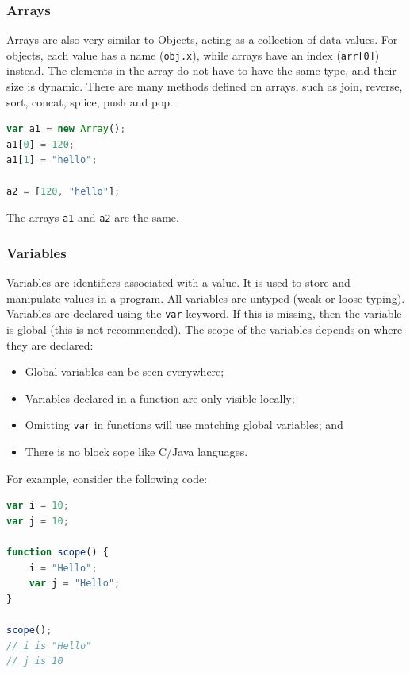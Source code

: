 \documentclass[a4paper, openany]{memoir}
\begin{document}
\subsubsection{Arrays}
Arrays are also very similar to Objects, acting as a collection of data values. For objects, each value has a name (\texttt{obj.x}), while arrays have an index (\texttt{arr[0]}) instead. The elements in the array do not have to have the same type, and their size is dynamic. There are many methods defined on arrays, such as join, reverse, sort, concat, splice, push and pop.
\begin{lstlisting}[language=javascript]
var a1 = new Array();
a1[0] = 120;
a1[1] = "hello";

a2 = [120, "hello"];
\end{lstlisting}
The arrays \texttt{a1} and \texttt{a2} are the same.

\subsubsection{Variables}
Variables are identifiers associated with a value. It is used to store and manipulate values in a program. All variables are untyped (weak or loose typing). Variables are declared using the \texttt{var} keyword. If this is missing, then the variable is global (this is not recommended). The scope of the variables depends on where they are declared:
\begin{itemize}
    \item Global variables can be seen everywhere;
    \item Variables declared in a function are only visible locally;
    \item Omitting \texttt{var} in functions will use matching global variables; and
    \item There is no block sope like C/Java languages.
\end{itemize}
For example, consider the following code:
\begin{lstlisting}[language=javascript]
var i = 10;
var j = 10;

function scope() {
    i = "Hello";
    var j = "Hello";
}

scope();
// i is "Hello"
// j is 10
\end{lstlisting}
\end{document}

